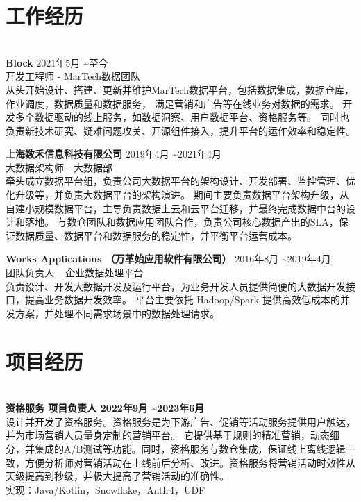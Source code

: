 \documentclass{res}[8.5pt]
\begin{document}
\thispagestyle{empty} %

\address{  {\bf 电话:} 18017661124 \hspace{0.25in}  {\bf   Email:} dd.famous@gmail.com}


\begin{resume}
\section{{工作经历}}
\hrulefill\\
{\bf Block} \hfill 2021年5月 \textasciitilde 至今 \\
开发工程师 - MarTech数据团队  \hspace{0.25in} \\
从头开始设计、搭建、更新并维护MarTech数据平台，包括数据集成，数据仓库，作业调度，数据质量和数据服务， 满足营销和广告等在线业务对数据的需求。
开发多个数据驱动的线上服务，如数据洞察、用户数据平台、资格服务等。
同时也负责新技术研究、疑难问题攻关、开源组件接入，提升平台的运作效率和稳定性。

{\bf 上海数禾信息科技有限公司} \hfill 2019年4月  \textasciitilde 2021年4月 \\
大数据架构师 - 大数据部    \hspace{0.25in} \\
牵头成立数据平台组，负责公司大数据平台的架构设计、开发部署、监控管理、优化升级等，并负责大数据平台的架构演进。
期间主要负责数据平台架构升级，从自建小规模数据平台，主导负责数据上云和云平台迁移，并最终完成数据中台的设计和落地。
与数仓团队和数据应用团队合作，负责公司核心数据产出的SLA，保证数据质量、数据平台和数据服务的稳定性，并平衡平台运营成本。

{\bf Works Applications （万革始应用软件有限公司）} \hfill 2016年8月 \textasciitilde 2019年4月\\
团队负责人 – 企业数据处理平台 \hspace{0.25in} \\
负责设计、开发大数据开发及运行平台，为业务开发人员提供简便的大数据开发接口，提高业务数据开发效率。
平台主要依托 Hadoop/Spark 提供高效低成本的并发方案，并处理不同需求场景中的数据处理请求。

\section{{项目经历}}

\hrulefill\\
{\bf 资格服务 \hspace{0.25in} \hfill 项目负责人 \hfill 2022年9月  \textasciitilde 2023年6月}\\
设计并开发了资格服务。资格服务是为下游广告、促销等活动服务提供用户触达，并为市场营销人员量身定制的营销平台。
它提供基于规则的精准营销，动态细分，并集成的A/B测试等功能。同时，资格服务与数仓集成，保证线上离线逻辑一致，方便分析师对营销活动在上线前后分析、改进。资格服务将营销活动时效性从天级提高到秒级，并极大提高了营销活动的准确性。\\
实现：Java/Kotlin，Snowflake，Antlr4，UDF


\end{resume}
\end{document}
